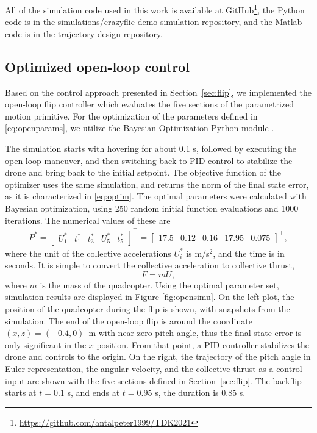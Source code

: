 All of the simulation code used in this work is available at GitHub\footnote{\url{https://github.com/antalpeter1999/TDK2021}}, the Python code is in the simulations/crazyflie-demo-simulation repository, and the Matlab code is in the trajectory-design repository.

\subsection{Optimized open-loop control}\label{sec:opensimu}
Based on the control approach presented in Section~\ref{sec:flip}, we implemented the open-loop flip controller which evaluates the five sections of the parametrized motion primitive. For the optimization of the parameters defined in \eqref{eq:openparams}, we utilize the Bayesian Optimization Python module \cite{bayesopt}.%

The simulation starts with hovering for about 0.1 s, followed by executing the open-loop maneuver, and then switching back to PID control to stabilize the drone and bring back to the initial setpoint. The objective function of the optimizer uses the same simulation, and returns the norm of the final state error, as it is characterized in \eqref{eq:optim}. The optimal parameters were calculated with Bayesian optimization, using 250 random initial function evaluations and 1000 iterations. The numerical values of these are
\begin{align}\label{eq:optparam}
P^*=\begin{bmatrix}
U_1^* & t_1^* & t_3^* & U_5^*& t_5^*
\end{bmatrix} ^\top =  \begin{bmatrix}
17.5 & 0.12 & 0.16 & 17.95 & 0.075
\end{bmatrix}^\top,
\end{align}
where the unit of the collective accelerations $U_i^*$ is m/s$^2$, and the time is in seconds. It is simple to convert the collective acceleration to collective thrust, 
\begin{equation}
    F = m U,
\end{equation}
where $m$ is the mass of the quadcopter. Using the optimal parameter set, simulation results are displayed in Figure \ref{fig:opensimu}. On the left plot, the position of the quadcopter during the flip is shown, with snapshots from the simulation. The end of the open-loop flip is around the coordinate $(x, z)=(-0.4, 0)$~m with near-zero pitch angle, thus the final state error is only significant in the $x$ position. From that point, a PID controller stabilizes the drone and controls to the origin. On the right, the trajectory of the pitch angle in Euler representation, the angular velocity, and the collective thrust as a control input are shown with the five sections defined in Section~\ref{sec:flip}. The backflip starts at $t=0.1$ s, and ends at $t=0.95$ s, the duration is 0.85 s.

